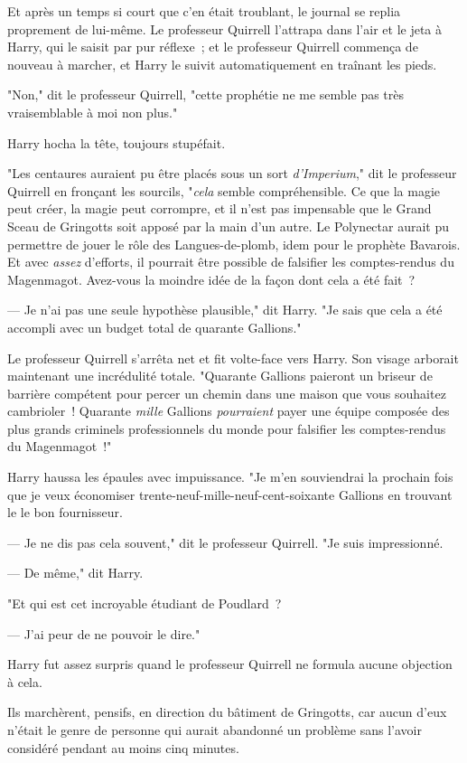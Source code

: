 Et après un temps si court que c'en était troublant, le journal se replia proprement de lui-même. Le professeur Quirrell l'attrapa dans l'air et le jeta à Harry, qui le saisit par pur réflexe~; et le professeur Quirrell commença de nouveau à marcher, et Harry le suivit automatiquement en traînant les pieds.

"Non," dit le professeur Quirrell, "cette prophétie ne me semble pas très vraisemblable à moi non plus."

Harry hocha la tête, toujours stupéfait.

"Les centaures auraient pu être placés sous un sort \emph{d'Imperium}," dit le professeur Quirrell en fronçant les sourcils, "\emph{cela} semble compréhensible. Ce que la magie peut créer, la magie peut corrompre, et il n'est pas impensable que le Grand Sceau de Gringotts soit apposé par la main d'un autre. Le Polynectar aurait pu permettre de jouer le rôle des Langues-de-plomb, idem pour le prophète Bavarois. Et avec \emph{assez} d'efforts, il pourrait être possible de falsifier les comptes-rendus du Magenmagot. Avez-vous la moindre idée de la façon dont cela a été fait~?

--- Je n'ai pas une seule hypothèse plausible," dit Harry. "Je sais que cela a été accompli avec un budget total de quarante Gallions."

Le professeur Quirrell s'arrêta net et fit volte-face vers Harry. Son visage arborait maintenant une incrédulité totale. "Quarante Gallions paieront un briseur de barrière compétent pour percer un chemin dans une maison que vous souhaitez cambrioler~! Quarante \emph{mille} Gallions \emph{pourraient} payer une équipe composée des plus grands criminels professionnels du monde pour falsifier les comptes-rendus du Magenmagot~!"

Harry haussa les épaules avec impuissance. "Je m'en souviendrai la prochain fois que je veux économiser trente-neuf-mille-neuf-cent-soixante Gallions en trouvant le le bon fournisseur.

--- Je ne dis pas cela souvent," dit le professeur Quirrell. "Je suis impressionné.

--- De même," dit Harry.

"Et qui est cet incroyable étudiant de Poudlard~?

--- J'ai peur de ne pouvoir le dire."

Harry fut assez surpris quand le professeur Quirrell ne formula aucune objection à cela.

Ils marchèrent, pensifs, en direction du bâtiment de Gringotts, car aucun d'eux n'était le genre de personne qui aurait abandonné un problème sans l'avoir considéré pendant au moins cinq minutes.

